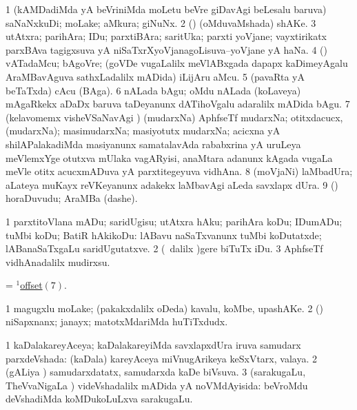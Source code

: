 \bentry
{}
\gl{\nA}
\bmng
\bnum
\num{1} (kAMDadiMda yA beVriniMda moLetu beVre giDavAgi beLesalu baruva) saNaNxkuDi; moLake; aMkura; giNuNx. 
\num{2} (\rUpa) (oMduvaMshada) shAKe. 
\num{3} utAtxra; parihAra; IDu; parxtiBAra; saritUka; parxti yoVjane; vayxtirikatx parxBAva tagigxsuva yA niSaTxrXyoVjanagoLisuva--yoVjane yA haNa. 
\num{4} (\vAshi) vATadaMcu; bAgoVre; (goVDe \mo vugaLalilx meVlABxgada dapapx kaDimeyAgalu AraMBavAguva sathxLadalilx mADida) iLijAru aMcu. 
\num{5} (pavaRta yA beTaTxda) cAcu (BAga). 
\num{6} nALada bAgu; oMdu nALada (koLaveya) mAgaRkekx aDaDx baruva taDeyanunx dATihoVgalu adaralilx mADida bAgu. 
\hypertarget{offset(1)7}{} 
\num{7} (kelavomemx visheVSaNavAgi \parx) (mudarxNa) AphfseTf mudarxNa; otitxdacucx, (mudarxNa); masimudarxNa; masiyotutx mudarxNa; acicxna yA shilAPalakadiMda masiyanunx samatalavAda rababxrina yA uruLeya meVlemxYge otutxva mUlaka vagARyisi, anaMtara adanunx kAgada \mo vugaLa meVle otitx acucxmADuva yA parxtitegeyuva vidhAna. 
\num{8} (moVjaNi) laMbadUra; aLateya muKayx reVKeyanunx adakekx laMbavAgi aLeda savxlapx dUra. 
\num{9} (\viparx) horaDuvudu; AraMBa (dashe). 
\enum
\emng
\eentry

\bentry
{}
\gl{\sakirx}
\bmng
\bnum
\num{1} parxtitoVlana mADu; saridUgisu; utAtxra hAku; parihAra koDu; IDumADu; tuMbi koDu; BatiR hAkikoDu:  lABavu naSaTxvanunx tuMbi koDutatxde; lABanaSaTxgaLu saridUgutatxve. 
\num{2} (\kanmu\ \BUkaq dalilx )gere biTuTx iDu. 
\num{3} AphfseTf vidhAnadalilx mudirxsu. 
\enum
\emng
\eentry

\bentry
{}
\gl{\nA}
\bmng
= \hyperlink{offset(1)7}{$^1$offset\((7)\)}. 
\emng
\eentry

\bentry
{}
\gl{\nA}
\bmng
\bnum
\num{1} magugxlu moLake; (pakakxdalilx oDeda) kavalu, koMbe, upashAKe. 
\num{2} (\rUpa) niSapxnanx; janayx; matotxMdariMda huTiTxdudx. 
\enum
\emng
\eentry

\bentry
{}
\gl{\gu}
\bmng
\bnum
\num{1} kaDalakareyAceya; kaDalakareyiMda savxlapxdUra iruva samudarx parxdeVshada:  (kaDala) kareyAceya miVnugArikeya keSxVtarx, valaya. 
\num{2} (gALiya \vi) samudarxdatatx, samudarxda kaDe biVsuva. 
\num{3} (sarakugaLu, TheVvaNigaLa \vi) videVshadalilx mADida yA noVMdAyisida:  beVroMdu deVshadiMda koMDukoLuLxva sarakugaLu. 
\enum
\emng
\eentry

